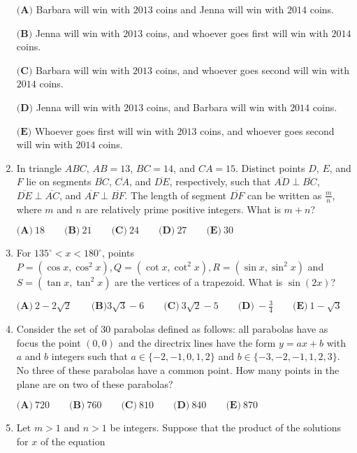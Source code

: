 \documentclass{article}
\begin{document}
\begin{enumerate}[label=\arabic*., itemsep=0.5em]
\( \textbf{(A)}\) Barbara will win with \(2013\) coins and Jenna will win with \(2014\) coins. 

\(\textbf{(B)}\) Jenna will win with \(2013\) coins, and whoever goes first will win with \(2014\) coins. 

\(\textbf{(C)}\) Barbara will win with \(2013\) coins, and whoever goes second will win with \(2014\) coins.

\(\textbf{(D)}\) Jenna will win with \(2013\) coins, and Barbara will win with \(2014\) coins.

\(\textbf{(E)}\) Whoever goes first will win with \(2013\) coins, and whoever goes second will win with \(2014\) coins.\par \vspace{0.5em}\item In triangle \(ABC\), \(AB=13\), \(BC=14\), and \(CA=15\). Distinct points \(D\), \(E\), and \(F\) lie on segments \(\overline{BC}\), \(\overline{CA}\), and \(\overline{DE}\), respectively, such that \(\overline{AD}\perp\overline{BC}\), \(\overline{DE}\perp\overline{AC}\), and \(\overline{AF}\perp\overline{BF}\). The length of segment \(\overline{DF}\) can be written as \(\frac{m}{n}\), where \(m\) and \(n\) are relatively prime positive integers. What is \(m+n\)?

\( \textbf{(A)}\ 18\qquad\textbf{(B)}\ 21\qquad\textbf{(C)}\ 24\qquad\textbf{(D)}\ 27\qquad\textbf{(E)}\ 30 \)\par \vspace{0.5em}\item For \(135^\circ < x < 180^\circ\), points \(P=(\cos x, \cos^2 x), Q=(\cot x, \cot^2 x), R=(\sin x, \sin^2 x)\) and \(S =(\tan x, \tan^2 x)\) are the vertices of a trapezoid. What is \(\sin(2x)\)?

\( \textbf{(A)}\ 2-2\sqrt{2}\qquad\textbf{(B)} 3\sqrt{3}-6\qquad\textbf{(C)}\ 3\sqrt{2}-5\qquad\textbf{(D)}\ -\frac{3}{4}\qquad\textbf{(E)}\ 1-\sqrt{3}\)\par \vspace{0.5em}\item Consider the set of \(30\) parabolas defined as follows: all parabolas have as focus the point \((0,0)\) and the directrix lines have the form \(y=ax+b\) with \(a\) and \(b\) integers such that \(a\in \{-2,-1,0,1,2\}\) and \(b\in \{-3,-2,-1,1,2,3\}\). No three of these parabolas have a common point. How many points in the plane are on two of these parabolas?

\( \textbf{(A)}\ 720\qquad\textbf{(B)}\ 760\qquad\textbf{(C)}\ 810\qquad\textbf{(D)}\ 840\qquad\textbf{(E)}\ 870 \)\par \vspace{0.5em}\item Let \(m>1\) and \(n>1\) be integers. Suppose that the product of the solutions for \(x\) of the equation


\end{enumerate}
\end{document}
